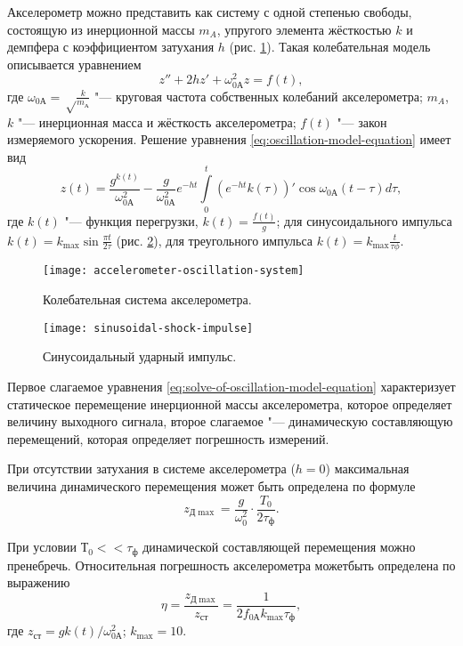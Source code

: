 Акселерометр можно представить как систему с одной степенью свободы, состоящую из инерционной массы $m_A$, упругого элемента жёсткостью $k$ и демпфера с коэффициентом затухания $h$ (рис. \ref{fig:accelerometer-oscillation-system}).
Такая колебательная модель описывается уравнением
\begin{equation}\label{eq:oscillation-model-equation}
    z'' + 2 h z' + \omega_{0А}^2 z = f(t),
\end{equation}
где $\omega_{0А} = \sqrt \frac{k}{m_А}$ "--- круговая частота собственных колебаний акселерометра; $m_A$, $k$ "--- инерционная масса и жёсткость акселерометра; $f(t)$ "--- закон измеряемого ускорения.
Решение уравнения \eqref{eq:oscillation-model-equation} имеет вид
\begin{equation}\label{eq:solve-of-oscillation-model-equation}
    z(t) = \frac{g^{k(t)}}{\omega_{0А}^2} - \frac{g}{\omega_{0А}^2} e^{-h t} \int \limits_0^t \left(e^{-h t} k (\tau)\right)' \cos \omega_{0А} (t - \tau) d\tau,
\end{equation}
где $k(t)$ "--- функция перегрузки, $k(t) = \frac{f(t)}{g}$; для синусоидального импульса $k(t) = k_{\max} \sin \frac{\pi t}{2 \tau}$ (рис. \ref{fig:sinusoidal-shock-impulse}), для треугольного импульса $k(t) = k_{\max} \frac{t}{\tau \phi}$.

\begin{figure}[H]
    \centering
    \texttt{[image: accelerometer-oscillation-system]}
    \caption{Колебательная система акселерометра.}
    \label{fig:accelerometer-oscillation-system}
\end{figure}

\begin{figure}[H]
    \centering
    \texttt{[image: sinusoidal-shock-impulse]}
    \caption{Синусоидальный ударный импульс.}
    \label{fig:sinusoidal-shock-impulse}
\end{figure}

Первое слагаемое уравнения \eqref{eq:solve-of-oscillation-model-equation} характеризует статическое перемещение инерционной массы акселерометра, которое определяет величину выходного сигнала, второе слагаемое "--- динамическую составляющую перемещений, которая определяет погрешность измерений.

При отсутствии затухания в системе акселерометра ($h = 0$) максимальная величина динамического перемещения может быть определена по формуле
\[
    z_{Д \max} = \frac{g}{\omega_0^2} \cdot \frac{T_0}{2 \tau_{ф}}.
\]

При условии $Т_0 << \tau_{ф}$ динамической составляющей перемещения можно пренебречь.
Относительная погрешность акселерометра можетбыть определена по выражению
\begin{equation}\label{eq:relative-error}
    \eta = \frac{z_{Д \max}}{z_{ст}} = \frac{1}{2 f_{0А} k_{\max} \tau_{ф}},
\end{equation}
где $z_{ст} = g k(t) / \omega_{0А}^2$; $k_{\max} = 10$.

